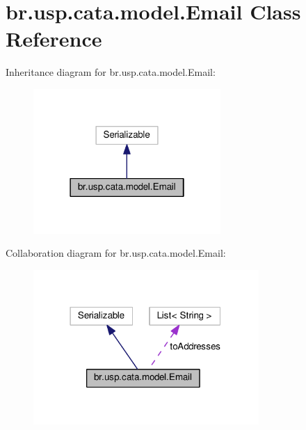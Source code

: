 \hypertarget{classbr_1_1usp_1_1cata_1_1model_1_1_email}{\section{br.\+usp.\+cata.\+model.\+Email Class Reference}
\label{classbr_1_1usp_1_1cata_1_1model_1_1_email}
}


Inheritance diagram for br.\+usp.\+cata.\+model.\+Email\+:\nopagebreak
\begin{figure}[H]
\begin{center}
\leavevmode
\includegraphics[width=202pt]{classbr_1_1usp_1_1cata_1_1model_1_1_email__inherit__graph}
\end{center}
\end{figure}


Collaboration diagram for br.\+usp.\+cata.\+model.\+Email\+:\nopagebreak
\begin{figure}[H]
\begin{center}
\leavevmode
\includegraphics[width=243pt]{classbr_1_1usp_1_1cata_1_1model_1_1_email__coll__graph}
\end{center}
\end{figure}
